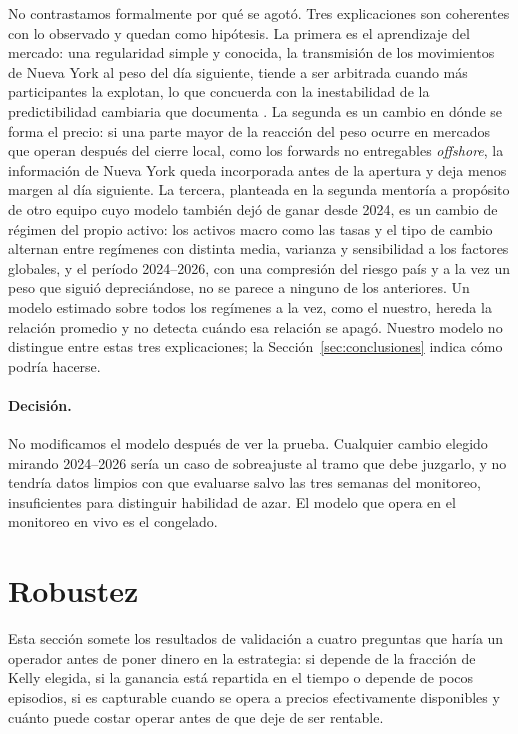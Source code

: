 \documentclass[11pt,a4paper]{article}
\begin{document}
No contrastamos formalmente por qué se agotó. Tres explicaciones son coherentes con lo observado y quedan como hipótesis. La primera es el aprendizaje del mercado: una regularidad simple y conocida, la transmisión de los movimientos de Nueva York al peso del día siguiente, tiende a ser arbitrada cuando más participantes la explotan, lo que concuerda con la inestabilidad de la predictibilidad cambiaria que documenta \citet{rossi2013}. La segunda es un cambio en dónde se forma el precio: si una parte mayor de la reacción del peso ocurre en mercados que operan después del cierre local, como los forwards no entregables \emph{offshore}, la información de Nueva York queda incorporada antes de la apertura y deja menos margen al día siguiente. La tercera, planteada en la segunda mentoría a propósito de otro equipo cuyo modelo también dejó de ganar desde 2024, es un cambio de régimen del propio activo: los activos macro como las tasas y el tipo de cambio alternan entre regímenes con distinta media, varianza y sensibilidad a los factores globales, y el período 2024--2026, con una compresión del riesgo país y a la vez un peso que siguió depreciándose, no se parece a ninguno de los anteriores. Un modelo estimado sobre todos los regímenes a la vez, como el nuestro, hereda la relación promedio y no detecta cuándo esa relación se apagó. Nuestro modelo no distingue entre estas tres explicaciones; la Sección~\ref{sec:conclusiones} indica cómo podría hacerse.

\paragraph{Decisión.} No modificamos el modelo después de ver la prueba. Cualquier cambio elegido mirando 2024--2026 sería un caso de sobreajuste al tramo que debe juzgarlo, y no tendría datos limpios con que evaluarse salvo las tres semanas del monitoreo, insuficientes para distinguir habilidad de azar. El modelo que opera en el monitoreo en vivo es el congelado.

\section{Robustez}\label{sec:robustez}

Esta sección somete los resultados de validación a cuatro preguntas que haría un operador antes de poner dinero en la estrategia: si depende de la fracción de Kelly elegida, si la ganancia está repartida en el tiempo o depende de pocos episodios, si es capturable cuando se opera a precios efectivamente disponibles y cuánto puede costar operar antes de que deje de ser rentable.
\end{document}
